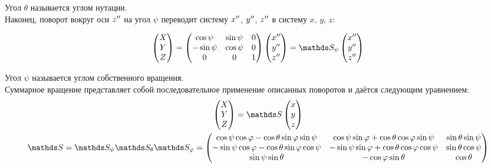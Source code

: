 Угол $\theta$ называется углом нутации.\\

\hspace{0.48cm} Наконец, поворот вокруг оси $z^{\prime \prime}$ на угол $\psi$ переводит систему $x^{\prime \prime}$, $y^{\prime \prime}$, $z^{\prime \prime}$ в систему $x$, $y$, $z$:

\begin{gather}
\begin{pmatrix}
X \\
Y \\
Z
\end{pmatrix} =
\begin{pmatrix}
\cos \psi & \sin \psi & 0 \\
- \sin \psi & \cos \psi & 0 \\
0 & 0 & 1
\end{pmatrix}
\begin{pmatrix}
x^{\dpr} \\
y^{\dpr} \\
z^{\dpr}
\end{pmatrix} = 
\bbS_\psi 
\begin{pmatrix}
x^{\dpr} \\
y^{\dpr} \\
z^{\dpr}
\end{pmatrix} \notag
\end{gather}

Угол $\psi$ называется углом собственного вращения.\\

\hspace{0.48cm} Суммарное вращение представляет собой последовательное применение описанных поворотов и даётся следующим уравнением: 
\begin{gather}
\begin{pmatrix}
X \\
Y \\
Z
\end{pmatrix} = 
\bbS 
\begin{pmatrix}
x \\
y \\
z
\end{pmatrix} \notag \\
\bbS = \bbS_\psi \bbS_\theta \bbS_\varphi = 
\begin{pmatrix}
\cos \psi \cos \varphi - \cos \theta \sin \varphi \sin \psi & \cos \psi \sin \varphi + \cos \theta \cos \varphi \sin \psi & \sin \theta \sin \psi \\
- \sin \psi \cos \varphi - \cos \theta \sin \varphi \cos \psi & - \sin \psi \sin \varphi + \cos \theta \cos \varphi \cos \psi & \sin \theta \cos \psi \\
\sin \psi \sin \theta & - \cos \varphi \sin \theta & \cos \theta 
\end{pmatrix} \notag
\end{gather}

